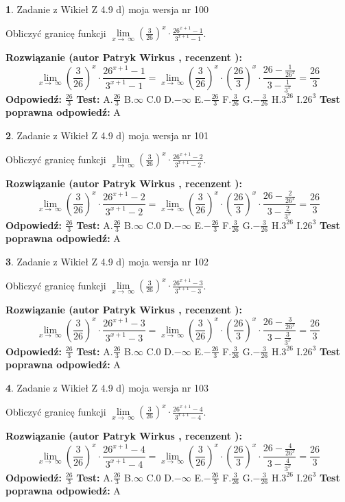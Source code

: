 \documentclass[12pt, a4paper]{article}
\theoremstyle{definition} %
\newtheorem{zad}{}
\newcommand{\zadStart}[1]{\begin{zad}#1\newline}
\newcommand{\zadStop}{\end{zad}}
\newcommand{\rozwStart}[2]{\noindent \textbf{Rozwiązanie (autor #1 , recenzent #2): }\newline}
\newcommand{\rozwStop}{\newline}
\newcommand{\odpStart}{\noindent \textbf{Odpowiedź:}\newline}
\newcommand{\odpStop}{\newline}
\newcommand{\testStart}{\noindent \textbf{Test:}\newline}
\newcommand{\testStop}{\newline}
\newcommand{\kluczStart}{\noindent \textbf{Test poprawna odpowiedź:}\newline}
\newcommand{\kluczStop}{\newline}
\begin{document}
\zadStart{Zadanie z Wikieł Z 4.9 d) moja wersja nr 100}


Obliczyć granicę funkcji  $\lim\limits_{x\to\ \infty}(\frac{3}{26})^{x}\cdot\frac{26^{x+1}-1}{3^{x+1}-1}$.
\zadStop
\rozwStart{Patryk Wirkus}{}
$$\lim\limits_{x\to\ \infty}(\frac{3}{26})^{x}\cdot\frac{26^{x+1}-1}{3^{x+1}-1}=\lim\limits_{x\to\ \infty}(\frac{3}{26})^{x}\cdot(\frac{26}{3})^{x} \cdot \frac{26-\frac{1}{26^{x}}}{3-\frac{1}{3^{x}}} = \frac{26}{3}$$
\rozwStop
\odpStart
$\frac{26}{3}$
\odpStop
\testStart
A.$\frac{26}{3}$ B.$\infty$ C.$0$ D.$-\infty$ E.$-\frac{26}{3}$
F.$\frac{3}{26}$ G.$-\frac{3}{26}$
H.$3^{26}$
I.$26^{3}$
\testStop
\kluczStart
A
\kluczStop



\zadStart{Zadanie z Wikieł Z 4.9 d) moja wersja nr 101}


Obliczyć granicę funkcji  $\lim\limits_{x\to\ \infty}(\frac{3}{26})^{x}\cdot\frac{26^{x+1}-2}{3^{x+1}-2}$.
\zadStop
\rozwStart{Patryk Wirkus}{}
$$\lim\limits_{x\to\ \infty}(\frac{3}{26})^{x}\cdot\frac{26^{x+1}-2}{3^{x+1}-2}=\lim\limits_{x\to\ \infty}(\frac{3}{26})^{x}\cdot(\frac{26}{3})^{x} \cdot \frac{26-\frac{2}{26^{x}}}{3-\frac{2}{3^{x}}} = \frac{26}{3}$$
\rozwStop
\odpStart
$\frac{26}{3}$
\odpStop
\testStart
A.$\frac{26}{3}$ B.$\infty$ C.$0$ D.$-\infty$ E.$-\frac{26}{3}$
F.$\frac{3}{26}$ G.$-\frac{3}{26}$
H.$3^{26}$
I.$26^{3}$
\testStop
\kluczStart
A
\kluczStop



\zadStart{Zadanie z Wikieł Z 4.9 d) moja wersja nr 102}


Obliczyć granicę funkcji  $\lim\limits_{x\to\ \infty}(\frac{3}{26})^{x}\cdot\frac{26^{x+1}-3}{3^{x+1}-3}$.
\zadStop
\rozwStart{Patryk Wirkus}{}
$$\lim\limits_{x\to\ \infty}(\frac{3}{26})^{x}\cdot\frac{26^{x+1}-3}{3^{x+1}-3}=\lim\limits_{x\to\ \infty}(\frac{3}{26})^{x}\cdot(\frac{26}{3})^{x} \cdot \frac{26-\frac{3}{26^{x}}}{3-\frac{3}{3^{x}}} = \frac{26}{3}$$
\rozwStop
\odpStart
$\frac{26}{3}$
\odpStop
\testStart
A.$\frac{26}{3}$ B.$\infty$ C.$0$ D.$-\infty$ E.$-\frac{26}{3}$
F.$\frac{3}{26}$ G.$-\frac{3}{26}$
H.$3^{26}$
I.$26^{3}$
\testStop
\kluczStart
A
\kluczStop



\zadStart{Zadanie z Wikieł Z 4.9 d) moja wersja nr 103}


Obliczyć granicę funkcji  $\lim\limits_{x\to\ \infty}(\frac{3}{26})^{x}\cdot\frac{26^{x+1}-4}{3^{x+1}-4}$.
\zadStop
\rozwStart{Patryk Wirkus}{}
$$\lim\limits_{x\to\ \infty}(\frac{3}{26})^{x}\cdot\frac{26^{x+1}-4}{3^{x+1}-4}=\lim\limits_{x\to\ \infty}(\frac{3}{26})^{x}\cdot(\frac{26}{3})^{x} \cdot \frac{26-\frac{4}{26^{x}}}{3-\frac{4}{3^{x}}} = \frac{26}{3}$$
\rozwStop
\odpStart
$\frac{26}{3}$
\odpStop
\testStart
A.$\frac{26}{3}$ B.$\infty$ C.$0$ D.$-\infty$ E.$-\frac{26}{3}$
F.$\frac{3}{26}$ G.$-\frac{3}{26}$
H.$3^{26}$
I.$26^{3}$
\testStop
\kluczStart
A
\kluczStop
\end{document}
